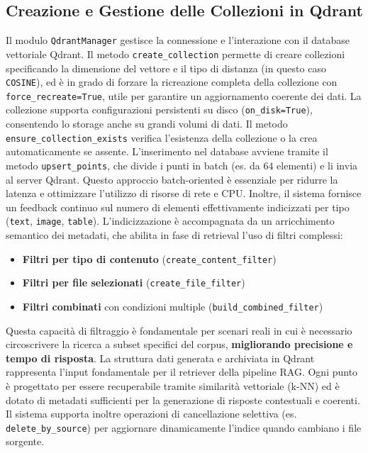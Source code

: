 \subsection{Creazione e Gestione delle Collezioni in Qdrant}
Il modulo \verb|QdrantManager| gestisce la connessione e l'interazione con il database vettoriale Qdrant. Il metodo \verb|create_collection| permette di creare collezioni specificando la dimensione del vettore e il tipo di distanza (in questo caso \verb|COSINE|), ed è in grado di forzare la ricreazione completa della collezione con \verb|force_recreate=True|, utile per garantire un aggiornamento coerente dei dati.
La collezione supporta configurazioni persistenti su disco (\verb|on_disk=True|), consentendo lo storage anche su grandi volumi di dati. Il metodo \verb|ensure_collection_exists| verifica l'esistenza della collezione o la crea automaticamente se assente.
L’inserimento nel database avviene tramite il metodo \verb|upsert_points|, che divide i punti in batch (es. da 64 elementi) e li invia al server Qdrant. Questo approccio batch-oriented è essenziale per ridurre la latenza e ottimizzare l’utilizzo di risorse di rete e CPU. Inoltre, il sistema fornisce un feedback continuo sul numero di elementi effettivamente indicizzati per tipo (\verb|text|, \verb|image|, \verb|table|).
L’indicizzazione è accompagnata da un arricchimento semantico dei metadati, che abilita in fase di retrieval l’uso di filtri complessi:
\begin{itemize}
    \item \textbf{Filtri per tipo di contenuto} (\verb|create_content_filter|)
    \item \textbf{Filtri per file selezionati} (\verb|create_file_filter|)
    \item \textbf{Filtri combinati} con condizioni multiple (\verb|build_combined_filter|)
\end{itemize}
Questa capacità di filtraggio è fondamentale per scenari reali in cui è necessario circoscrivere la ricerca a subset specifici del corpus, \textbf{migliorando precisione e tempo di risposta}.
La struttura dati generata e archiviata in Qdrant rappresenta l’input fondamentale per il retriever della pipeline RAG. Ogni punto è progettato per essere recuperabile tramite similarità vettoriale (k-NN) ed è dotato di metadati sufficienti per la generazione di risposte contestuali e coerenti. Il sistema supporta inoltre operazioni di cancellazione selettiva (es. \verb|delete_by_source|) per aggiornare dinamicamente l’indice quando cambiano i file sorgente.

